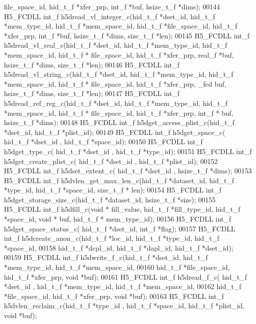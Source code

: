 \begin{DoxyCode}
      file\_space\_id, hid\_t\_f *xfer\_prp, int\_f *buf, hsize\_t\_f *dims);
00144 H5\_FCDLL int\_f h5dread\_vl\_integer\_c(hid\_t\_f *dset\_id, hid\_t\_f *mem\_type\_id, hid\_t\_f *mem\_space\_id, hid\_t\_f 
      *file\_space\_id, hid\_t\_f *xfer\_prp, int\_f *buf, hsize\_t\_f *dims, size\_t\_f *len);
00145 H5\_FCDLL int\_f h5dread\_vl\_real\_c(hid\_t\_f *dset\_id, hid\_t\_f *mem\_type\_id, hid\_t\_f *mem\_space\_id, hid\_t\_f *
      file\_space\_id, hid\_t\_f *xfer\_prp, real\_f *buf, hsize\_t\_f *dims, size\_t\_f *len);
00146 H5\_FCDLL int\_f h5dread\_vl\_string\_c(hid\_t\_f *dset\_id, hid\_t\_f *mem\_type\_id, hid\_t\_f *mem\_space\_id, hid\_t\_f *
      file\_space\_id, hid\_t\_f *xfer\_prp, \_fcd buf, hsize\_t\_f *dims, size\_t\_f *len);
00147 H5\_FCDLL int\_f h5dread\_ref\_reg\_c(hid\_t\_f *dset\_id, hid\_t\_f *mem\_type\_id, hid\_t\_f *mem\_space\_id, hid\_t\_f *
      file\_space\_id, hid\_t\_f *xfer\_prp, int\_f * buf, hsize\_t\_f *dims);
00148 H5\_FCDLL int\_f h5dget\_access\_plist\_c(hid\_t\_f *dset\_id, hid\_t\_f *plist\_id);
00149 H5\_FCDLL int\_f h5dget\_space\_c( hid\_t\_f *dset\_id , hid\_t\_f *space\_id);
00150 H5\_FCDLL int\_f h5dget\_type\_c( hid\_t\_f *dset\_id , hid\_t\_f *type\_id);
00151 H5\_FCDLL int\_f h5dget\_create\_plist\_c( hid\_t\_f *dset\_id , hid\_t\_f *plist\_id);
00152 H5\_FCDLL int\_f h5dset\_extent\_c( hid\_t\_f *dset\_id , hsize\_t\_f *dims);
00153 H5\_FCDLL int\_f h5dvlen\_get\_max\_len\_c(hid\_t\_f *dataset\_id, hid\_t\_f *type\_id, hid\_t\_f *space\_id, size\_t\_f *
      len);
00154 H5\_FCDLL int\_f h5dget\_storage\_size\_c(hid\_t\_f *dataset\_id, hsize\_t\_f *size);
00155 H5\_FCDLL int\_f h5dfill\_c(\textcolor{keywordtype}{void} * fill\_value, hid\_t\_f *fill\_type\_id, hid\_t\_f *space\_id, \textcolor{keywordtype}{void} * buf, hid\_t\_f *
      mem\_type\_id);
00156 H5\_FCDLL int\_f h5dget\_space\_status\_c( hid\_t\_f *dset\_id, int\_f *flag);
00157 H5\_FCDLL int\_f h5dcreate\_anon\_c(hid\_t\_f *loc\_id, hid\_t\_f *type\_id, hid\_t\_f *space\_id,
00158                   hid\_t\_f *dcpl\_id, hid\_t\_f *dapl\_id, hid\_t\_f *dset\_id);
00159 H5\_FCDLL int\_f h5dwrite\_f\_c(hid\_t\_f *dset\_id, hid\_t\_f *mem\_type\_id, hid\_t\_f *mem\_space\_id, 
00160                    hid\_t\_f *file\_space\_id, hid\_t\_f *xfer\_prp, \textcolor{keywordtype}{void} *buf);
00161 H5\_FCDLL int\_f h5dread\_f\_c( hid\_t\_f *dset\_id ,  hid\_t\_f *mem\_type\_id, hid\_t\_f *mem\_space\_id, 
00162                    hid\_t\_f *file\_space\_id, hid\_t\_f *xfer\_prp, \textcolor{keywordtype}{void} *buf);
00163 H5\_FCDLL int\_f h5dvlen\_reclaim\_c(hid\_t\_f *type\_id ,  hid\_t\_f *space\_id, hid\_t\_f *plist\_id, \textcolor{keywordtype}{void} *buf);

\end{DoxyCode}
